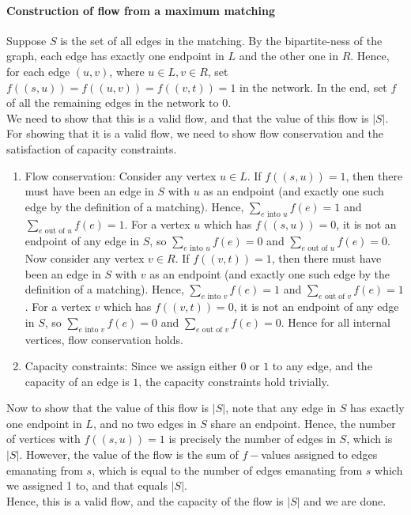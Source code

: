 \documentclass[answers]{exam}
\newcommand{\nl}{\vspace{0.2cm}\\}
\begin{document}
\begin{questions}
\begin{parts}
\begin{solution}
\paragraph{Construction of flow from a maximum matching}
Suppose $S$ is the set of all edges in the matching. By the bipartite-ness of the graph, each edge has exactly one endpoint in $L$ and the other one in $R$. Hence, for each edge $(u, v)$, where $u \in L, v \in R$, set $f((s, u)) = f((u, v)) = f((v, t)) = 1$ in the network. In the end, set $f$ of all the remaining edges in the network to $0$.\nl
We need to show that this is a valid flow, and that the value of this flow is $|S|$.\nl
For showing that it is a valid flow, we need to show flow conservation and the satisfaction of capacity constraints.
\begin{enumerate}
    \item Flow conservation: Consider any vertex $u \in L$. If $f((s, u)) = 1$, then there must have been an edge in $S$ with $u$ as an endpoint (and exactly one such edge by the definition of a matching). Hence, $\sum_{e \text{ into } u}f(e) = 1$ and $\sum_{e \text{ out of } u}f(e) = 1$. For a vertex $u$ which has $f((s, u)) = 0$, it is not an endpoint of any edge in $S$, so $\sum_{e \text{ into } u}f(e) = 0$ and $\sum_{e \text{ out of } u}f(e) = 0$. Now consider any vertex $v \in R$. If $f((v, t)) = 1$, then there must have been an edge in $S$ with $v$ as an endpoint (and exactly one such edge by the definition of a matching). Hence, $\sum_{e \text{ into } v}f(e) = 1$ and $\sum_{e \text{ out of } v}f(e) = 1$. For a vertex $v$ which has $f((v, t)) = 0$, it is not an endpoint of any edge in $S$, so $\sum_{e \text{ into } v}f(e) = 0$ and $\sum_{e \text{ out of } v}f(e) = 0$. Hence for all internal vertices, flow conservation holds.
    \item Capacity constraints: Since we assign either $0$ or $1$ to any edge, and the capacity of an edge is $1$, the capacity constraints hold trivially.
\end{enumerate}
Now to show that the value of this flow is $|S|$, note that any edge in $S$ has exactly one endpoint in $L$, and no two edges in $S$ share an endpoint. Hence, the number of vertices with $f((s, u)) = 1$ is precisely the number of edges in $S$, which is $|S|$. However, the value of the flow is the sum of $f-$values assigned to edges emanating from $s$, which is equal to the number of edges emanating from $s$ which we assigned 1 to, and that equals $|S|$.\nl
Hence, this is a valid flow, and the capacity of the flow is $|S|$ and we are done.

\end{solution}
\end{parts}
\end{questions}
\end{document}
